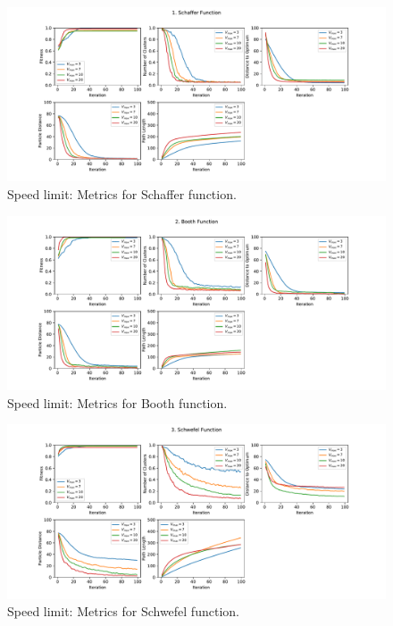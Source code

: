 \documentclass[12pt]{article}
\begin{document}
\begin{figure}[h!]
	\centering
	\includegraphics[width=1\textwidth]{figures/ex5/ex5-1.pdf}
	\caption{Speed limit: Metrics for Schaffer function.}
	\label{fig:ex5-1}
\end{figure}
\begin{figure}[h!]
	\centering
	\includegraphics[width=1\textwidth]{figures/ex5/ex5-2.pdf}
	\caption{Speed limit: Metrics for Booth function.}
	\label{fig:ex5-2}
\end{figure}
\begin{figure}[h!]
	\centering
	\includegraphics[width=1\textwidth]{figures/ex5/ex5-3.pdf}
	\caption{Speed limit: Metrics for Schwefel function.}
	\label{fig:ex5-3}
\end{figure}
\end{document}

